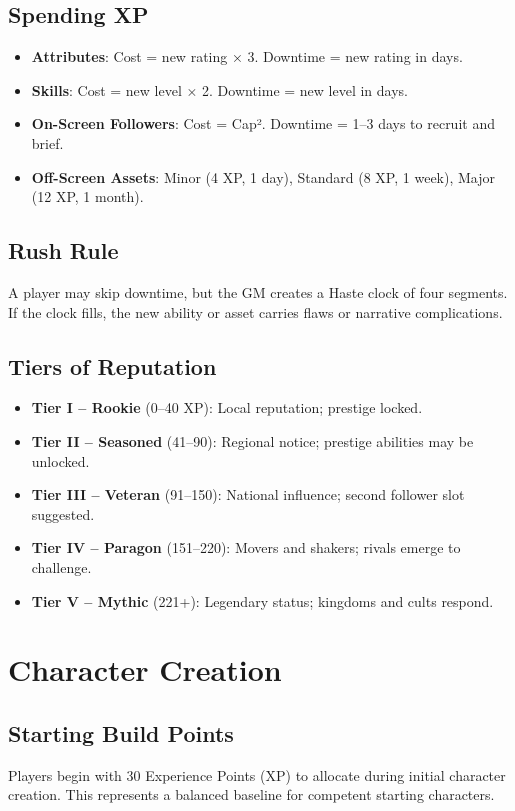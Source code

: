 \documentclass[11pt]{article}
\begin{document}
\subsection{Spending XP}
\begin{itemize}
    \item \textbf{Attributes}: Cost = new rating × 3. Downtime = new rating in days.
    \item \textbf{Skills}: Cost = new level × 2. Downtime = new level in days.
    \item \textbf{On-Screen Followers}: Cost = Cap². Downtime = 1–3 days to recruit and brief.
    \item \textbf{Off-Screen Assets}: Minor (4 XP, 1 day), Standard (8 XP, 1 week), Major (12 XP, 1 month).
\end{itemize}

\subsection{Rush Rule}
A player may skip downtime, but the GM creates a Haste clock of four segments. If the clock fills, the new ability or asset carries flaws or narrative complications.

\subsection{Tiers of Reputation}
\begin{itemize}
    \item \textbf{Tier I – Rookie} (0–40 XP): Local reputation; prestige locked.
    \item \textbf{Tier II – Seasoned} (41–90): Regional notice; prestige abilities may be unlocked.
    \item \textbf{Tier III – Veteran} (91–150): National influence; second follower slot suggested.
    \item \textbf{Tier IV – Paragon} (151–220): Movers and shakers; rivals emerge to challenge.
    \item \textbf{Tier V – Mythic} (221+): Legendary status; kingdoms and cults respond.
\end{itemize}

\section{Character Creation}
\subsection{Starting Build Points}
Players begin with 30 Experience Points (XP) to allocate during initial character creation. This represents a balanced baseline for competent starting characters.
\end{document}
